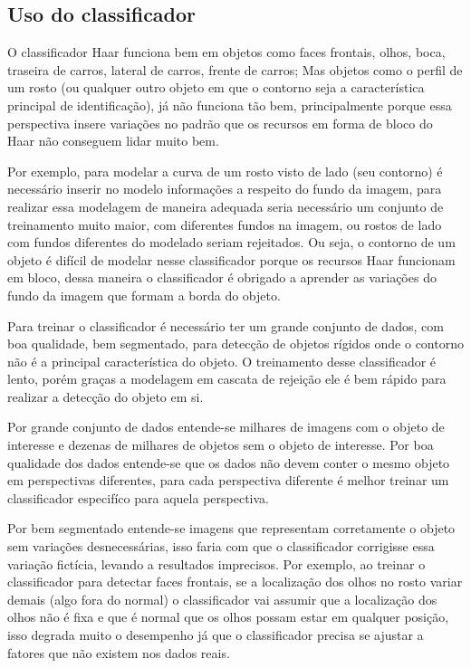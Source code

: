 \subsection{Uso do classificador}

O classificador Haar funciona bem em objetos como faces frontais, olhos, boca, traseira de carros, lateral de carros, frente de carros; Mas objetos como o perfil de um rosto (ou qualquer outro objeto em que o contorno seja a característica principal de identificação), já não funciona tão bem, principalmente porque essa perspectiva insere variações no padrão que os recursos em forma de bloco do Haar não conseguem lidar muito bem. 

Por exemplo, para modelar a curva de um rosto visto de lado (seu contorno) é necessário inserir no modelo informações a respeito do fundo da imagem, para realizar essa modelagem de maneira adequada seria necessário um conjunto de treinamento muito maior, com diferentes fundos na imagem, ou rostos de lado com fundos diferentes do modelado seriam rejeitados. Ou seja, o contorno de um objeto é difícil de modelar nesse classificador porque os recursos Haar funcionam em bloco, dessa maneira o classificador é obrigado a aprender as variações do fundo da imagem que formam a borda do objeto.

Para treinar o classificador é necessário ter um grande conjunto de dados, com boa qualidade, bem segmentado, para detecção de objetos rígidos onde o contorno não é a principal característica do objeto. O treinamento desse classificador é lento, porém graças a modelagem em cascata de rejeição ele é bem rápido para realizar a detecção do objeto em si.

Por grande conjunto de dados entende-se milhares de imagens com o objeto de interesse e dezenas de milhares de objetos sem o objeto de interesse. Por boa qualidade dos dados entende-se que os dados não devem conter o mesmo objeto em perspectivas diferentes, para cada perspectiva diferente é melhor treinar um classificador especifíco para aquela perspectiva. 

Por bem segmentado entende-se imagens que representam corretamente o objeto sem variações desnecessárias, isso faria com que o classificador corrigisse essa variação fictícia, levando a resultados imprecisos. Por exemplo, ao treinar o classificador para detectar faces frontais, se a localização dos olhos no rosto variar demais (algo fora do normal) o classificador vai assumir que a localização dos olhos não é fixa e que é normal que os olhos possam estar em qualquer posição, isso degrada muito o desempenho já que o classificador precisa se ajustar a fatores que não existem nos dados reais.

